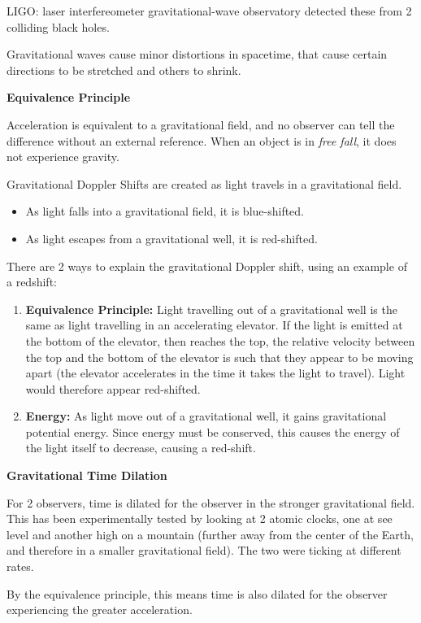 \documentclass[12pt]{article}
\begin{document}
LIGO: laser interfereometer gravitational-wave observatory detected these from 2 colliding black holes.

Gravitational waves cause minor distortions in spacetime, that cause certain directions to be stretched and others to shrink.

\textbf{Equivalence Principle}

Acceleration is equivalent to a gravitational field, and no observer can tell the difference without an external reference. When an object is in \textit{free fall}, it does not experience gravity.

Gravitational Doppler Shifts are created as light travels in a gravitational field.
	\begin{itemize}
		\item As light falls into a gravitational field, it is blue-shifted.
		\item As light escapes from a gravitational well, it is red-shifted.
	\end{itemize}
	
There are 2 ways to explain the gravitational Doppler shift, using an example of a redshift:
	\begin{enumerate}
		\item \textbf{Equivalence Principle:} Light travelling out of a gravitational well is the same as light travelling in an accelerating elevator. If the light is emitted at the bottom of the elevator, then reaches the top, the relative velocity between the top and the bottom of the elevator is such that they appear to be moving apart (the elevator accelerates in the time it takes the light to travel). Light would therefore appear red-shifted.
		\item \textbf{Energy:} As light move out of a gravitational well, it gains gravitational potential energy. Since energy must be conserved, this causes the energy of the light itself to decrease, causing a red-shift.
	\end{enumerate}

\textbf{Gravitational Time Dilation}

For 2 observers, time is dilated for the observer in the stronger gravitational field. This has been experimentally tested by looking at 2 atomic clocks, one at see level and another high on a mountain (further away from the center of the Earth, and therefore in a smaller gravitational field). The two were ticking at different rates. 

By the equivalence principle, this means time is also dilated for the observer experiencing the greater acceleration.
\end{document}
